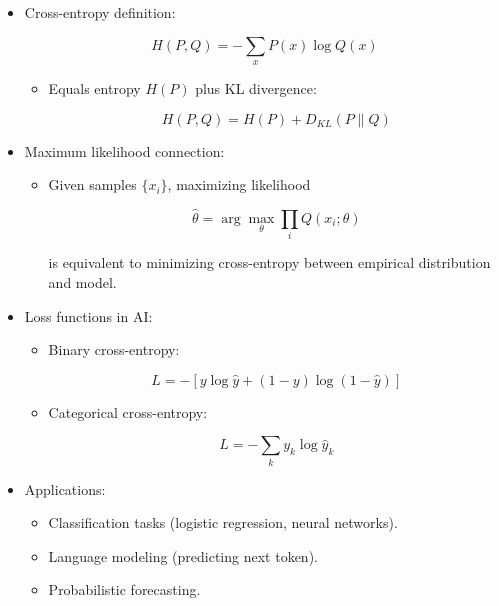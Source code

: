 \documentclass[
  letterpaper,
  DIV=11,
  numbers=noendperiod]{scrreprt}
\providecommand{\tightlist}{%
  \setlength{\itemsep}{0pt}\setlength{\parskip}{0pt}}
\begin{document}
\begin{itemize}
\item
  Cross-entropy definition:

  \[
  H(P, Q) = - \sum_x P(x) \log Q(x)
  \]

  \begin{itemize}
  \item
    Equals entropy \(H(P)\) plus KL divergence:

    \[
    H(P, Q) = H(P) + D_{KL}(P \parallel Q)
    \]
  \end{itemize}
\item
  Maximum likelihood connection:

  \begin{itemize}
  \item
    Given samples \(\{x_i\}\), maximizing likelihood

    \[
    \hat{\theta} = \arg\max_\theta \prod_i Q(x_i;\theta)
    \]

    is equivalent to minimizing cross-entropy between empirical
    distribution and model.
  \end{itemize}
\item
  Loss functions in AI:

  \begin{itemize}
  \item
    Binary cross-entropy:

    \[
    L = -[y \log \hat{y} + (1-y)\log(1-\hat{y})]
    \]
  \item
    Categorical cross-entropy:

    \[
    L = -\sum_{k} y_k \log \hat{y}_k
    \]
  \end{itemize}
\item
  Applications:

  \begin{itemize}
  \tightlist
  \item
    Classification tasks (logistic regression, neural networks).
  \item
    Language modeling (predicting next token).
  \item
    Probabilistic forecasting.
  \end{itemize}
\end{itemize}
\end{document}
